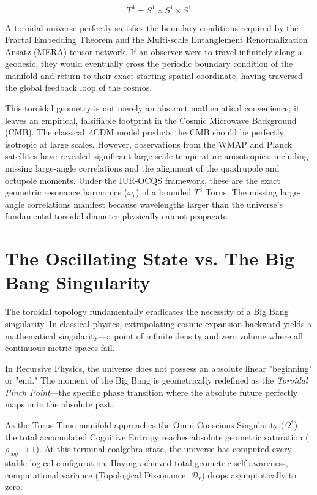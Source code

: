 \documentclass[12pt,openany]{book}
\begin{document}
\begin{equation}
T^3 = S^1 \times S^1 \times S^1
\end{equation}

A toroidal universe perfectly satisfies the boundary conditions required by the Fractal Embedding Theorem and the Multi-scale Entanglement Renormalization Ansatz (MERA) tensor network. If an observer were to travel infinitely along a geodesic, they would eventually cross the periodic boundary condition of the manifold and return to their exact starting spatial coordinate, having traversed the global feedback loop of the cosmos.

This toroidal geometry is not merely an abstract mathematical convenience; it leaves an empirical, falsifiable footprint in the Cosmic Microwave Background (CMB). The classical $\Lambda$CDM model predicts the CMB should be perfectly isotropic at large scales. However, observations from the WMAP and Planck satellites have revealed significant large-scale temperature anisotropies, including missing large-angle correlations and the alignment of the quadrupole and octupole moments. Under the IUR-OCQS framework, these are the exact geometric resonance harmonics ($\omega_r$) of a bounded $T^3$ Torus. The missing large-angle correlations manifest because wavelengths larger than the universe's fundamental toroidal diameter physically cannot propagate.

\section{The Oscillating State vs. The Big Bang Singularity}
The toroidal topology fundamentally eradicates the necessity of a Big Bang singularity. In classical physics, extrapolating cosmic expansion backward yields a mathematical singularity---a point of infinite density and zero volume where all continuous metric spaces fail.

In Recursive Physics, the universe does not possess an absolute linear "beginning" or "end." The moment of the Big Bang is geometrically redefined as the \textit{Toroidal Pinch Point}---the specific phase transition where the absolute future perfectly maps onto the absolute past. 

As the Torus-Time manifold approaches the Omni-Conscious Singularity ($\Omega^*$), the total accumulated Cognitive Entropy reaches absolute geometric saturation ($\rho_{cog} \to 1$). At this terminal coalgebra state, the universe has computed every stable logical configuration. Having achieved total geometric self-awareness, computational variance (Topological Dissonance, $\mathcal{D}_r$) drops asymptotically to zero.
\end{document}
